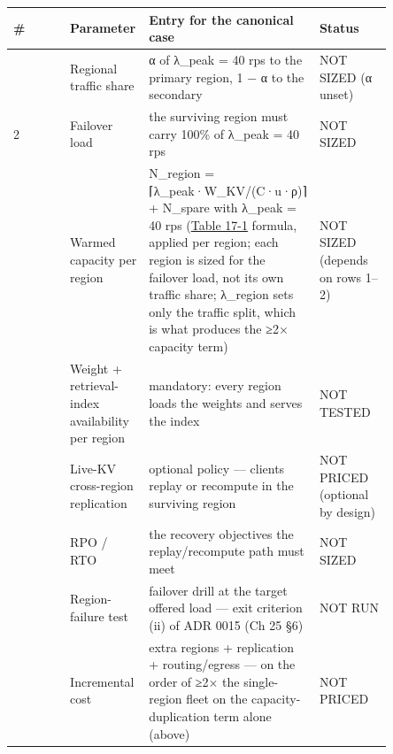 \nopagebreak[4]
\begin{longtable}[]{@{}
  >{\raggedright\arraybackslash}p{0.2127\linewidth}
  >{\raggedright\arraybackslash}p{0.2127\linewidth}
  >{\raggedright\arraybackslash}p{0.2127\linewidth}
  >{\raggedright\arraybackslash}p{0.2127\linewidth}@{}}
\toprule\noalign{}
\begin{minipage}[b]{\linewidth}\raggedright
\#
\end{minipage} & \begin{minipage}[b]{\linewidth}\raggedright
Parameter
\end{minipage} & \begin{minipage}[b]{\linewidth}\raggedright
Entry for the canonical case
\end{minipage} & \begin{minipage}[b]{\linewidth}\raggedright
Status
\end{minipage} \\
\midrule\noalign{}
\endhead
\bottomrule\noalign{}
\endlastfoot
1 & Regional traffic share & α of λ\_peak = 40 rps to the primary
region, 1 − α to the secondary & NOT SIZED (α unset) \\
\noalign{\label{tab:16.5}}
2 & Failover load & the surviving region must carry 100\% of λ\_peak =
40 rps & NOT SIZED \\
3 & Warmed capacity per region & N\_region = ⌈λ\_peak·W\_KV/(C·u·ρ)⌉ +
N\_spare with λ\_peak = 40 rps (\hyperref[tab:17.1]{Table 17-1} formula, applied per region;
each region is sized for the failover load, not its own traffic share;
λ\_region sets only the traffic split, which is what produces the ≥2×
capacity term) & NOT SIZED (depends on rows 1--2) \\
4 & Weight + retrieval-index availability per region & mandatory: every
region loads the weights and serves the index & NOT TESTED \\
5 & Live-KV cross-region replication & optional policy --- clients
replay or recompute in the surviving region & NOT PRICED (optional by
design) \\
6 & RPO / RTO & the recovery objectives the replay/recompute path must
meet & NOT SIZED \\
7 & Region-failure test & failover drill at the target offered load ---
exit criterion (ii) of ADR 0015 (Ch 25 §6) & NOT RUN \\
8 & Incremental cost & extra regions + replication + routing/egress ---
on the order of ≥2× the single-region fleet on the capacity-duplication
term alone (above) & NOT PRICED \\
\end{longtable}

